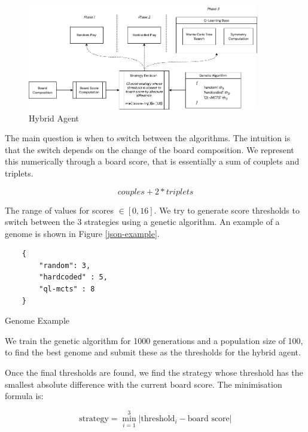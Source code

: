 \begin{figure}
    \centering
    \includegraphics[width=0.9\textwidth]{images/methodology.drawio.png}
    \caption{Hybrid Agent}
    \label{fig:hybrid-agent}
\end{figure}

The main question is when to switch between the algorithms. The intuition is that the switch depends on the change of the board composition. We represent this numerically through a board score, that is essentially a sum of couplets and triplets.

\begin{equation*}
    couples + 2 * triplets
\end{equation*}

The range of values for scores $\in [0, 16]$. We try to generate score thresholds to switch between the 3 strategies using a genetic algorithm. An example of a genome is shown in Figure \ref{json-example}.

\begin{listing}
    \begin{verbatim}
    {
        "random": 3,
        "hardcoded" : 5,
        "ql-mcts" : 8
    }
    \end{verbatim}
    \caption{Genome Example}
    \label{json-example}
    \end{listing}

We train the genetic algorithm for 1000 generations and a population size of 100, to find the best genome and submit these as the thresholds for the hybrid agent.

Once the final thresholds are found, we find the strategy whose threshold has the smallest absolute difference with the current board score. The minimisation formula is:

\begin{equation*}
    \text{strategy} = \min_{i=1}^{3} \left| \text{threshold}_i - \text{board score} \right|
\end{equation*}

